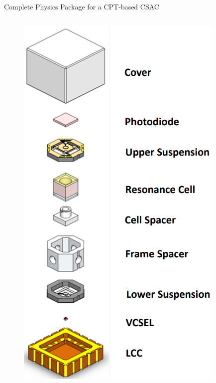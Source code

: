 \begin{frame}{Complete Physics Package for a CPT-based CSAC}
\begin{columns}[c, onlytextwidth]
\begin{column}{0.35\textwidth}
            \begin{figure}
                \centering
                \includegraphics[width=\textwidth]{img/CPT-physics-package-1.png}
            \end{figure}

        \end{column}

        \hfill


\end{columns}
\end{frame}
